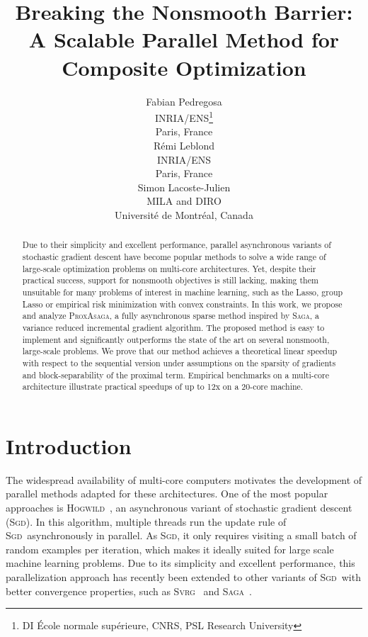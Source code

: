 \documentclass{article}
\title{Breaking the Nonsmooth Barrier: A Scalable Parallel Method for Composite Optimization}
\author{
    Fabian Pedregosa \\
    INRIA/ENS\thanks{DI \'{E}cole normale sup\'{e}rieure, CNRS, PSL Research University} \\ Paris, France\\
    \And
    R\'emi Leblond\\
    INRIA/ENS\footnotemark[1] \\
    Paris, France\\
    \And
    Simon Lacoste-Julien\\
    MILA and DIRO \\
    Universit\'{e} de Montr\'{e}al, Canada
}
\newcommand{\PASAGA}{\textsc{ProxAsaga}}
\newcommand{\SAGA}{\textsc{Saga}}
\newcommand{\SVRG}{\textsc{Svrg}}
\newcommand{\SGD}{\textsc{Sgd}}
\newcommand{\HOGWILD}{\textsc{Hogwild}}
\begin{document}
\maketitle


\begin{abstract}
  Due to their simplicity and excellent performance, parallel asynchronous variants of stochastic gradient descent have become popular methods to solve a wide range of large-scale optimization problems on multi-core architectures. Yet, despite their practical success, support for nonsmooth objectives is still lacking, making them unsuitable for many problems of interest in machine learning, such as the Lasso, group Lasso or empirical risk minimization with convex constraints.
  In this work, we propose and analyze \PASAGA, a fully asynchronous sparse method inspired by \SAGA, a variance reduced incremental gradient algorithm. The proposed method is easy to implement and significantly outperforms the state of the art on several nonsmooth, large-scale problems. We prove that our method achieves a theoretical linear speedup with respect to the sequential version under assumptions on the sparsity of gradients and block-separability of the proximal term. Empirical benchmarks on a multi-core architecture illustrate practical speedups of up to 12x on a 20-core machine.
\end{abstract}


\section{Introduction}
The widespread availability of multi-core computers motivates the development of parallel methods adapted for these architectures.
One of the most popular approaches is \HOGWILD~\citep{hogwild2011}, an asynchronous variant of stochastic gradient descent (\SGD).
In this algorithm, multiple threads run the update rule of \SGD\ asynchronously in parallel.
As \SGD, it only requires visiting a small batch of random examples per iteration, which makes it ideally suited for large scale machine learning problems.
Due to its simplicity and excellent performance, this parallelization approach has recently been extended to other variants of \SGD\ with better convergence properties, such as \SVRG~\citep{johnson2013accelerating} and \SAGA~\citep{defazio2014saga}.
\end{document}
